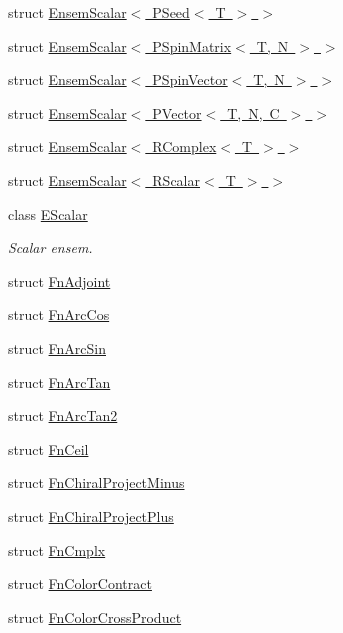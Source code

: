 \begin{DoxyCompactItemize}
\item 
struct \mbox{\hyperlink{structENSEM_1_1EnsemScalar_3_01PSeed_3_01T_01_4_01_4}{Ensem\+Scalar$<$ P\+Seed$<$ T $>$ $>$}}
\item 
struct \mbox{\hyperlink{structENSEM_1_1EnsemScalar_3_01PSpinMatrix_3_01T_00_01N_01_4_01_4}{Ensem\+Scalar$<$ P\+Spin\+Matrix$<$ T, N $>$ $>$}}
\item 
struct \mbox{\hyperlink{structENSEM_1_1EnsemScalar_3_01PSpinVector_3_01T_00_01N_01_4_01_4}{Ensem\+Scalar$<$ P\+Spin\+Vector$<$ T, N $>$ $>$}}
\item 
struct \mbox{\hyperlink{structENSEM_1_1EnsemScalar_3_01PVector_3_01T_00_01N_00_01C_01_4_01_4}{Ensem\+Scalar$<$ P\+Vector$<$ T, N, C $>$ $>$}}
\item 
struct \mbox{\hyperlink{structENSEM_1_1EnsemScalar_3_01RComplex_3_01T_01_4_01_4}{Ensem\+Scalar$<$ R\+Complex$<$ T $>$ $>$}}
\item 
struct \mbox{\hyperlink{structENSEM_1_1EnsemScalar_3_01RScalar_3_01T_01_4_01_4}{Ensem\+Scalar$<$ R\+Scalar$<$ T $>$ $>$}}
\item 
class \mbox{\hyperlink{classENSEM_1_1EScalar}{E\+Scalar}}
\begin{DoxyCompactList}\small\item\em Scalar ensem. \end{DoxyCompactList}\item 
struct \mbox{\hyperlink{structENSEM_1_1FnAdjoint}{Fn\+Adjoint}}
\item 
struct \mbox{\hyperlink{structENSEM_1_1FnArcCos}{Fn\+Arc\+Cos}}
\item 
struct \mbox{\hyperlink{structENSEM_1_1FnArcSin}{Fn\+Arc\+Sin}}
\item 
struct \mbox{\hyperlink{structENSEM_1_1FnArcTan}{Fn\+Arc\+Tan}}
\item 
struct \mbox{\hyperlink{structENSEM_1_1FnArcTan2}{Fn\+Arc\+Tan2}}
\item 
struct \mbox{\hyperlink{structENSEM_1_1FnCeil}{Fn\+Ceil}}
\item 
struct \mbox{\hyperlink{structENSEM_1_1FnChiralProjectMinus}{Fn\+Chiral\+Project\+Minus}}
\item 
struct \mbox{\hyperlink{structENSEM_1_1FnChiralProjectPlus}{Fn\+Chiral\+Project\+Plus}}
\item 
struct \mbox{\hyperlink{structENSEM_1_1FnCmplx}{Fn\+Cmplx}}
\item 
struct \mbox{\hyperlink{structENSEM_1_1FnColorContract}{Fn\+Color\+Contract}}
\item 
struct \mbox{\hyperlink{structENSEM_1_1FnColorCrossProduct}{Fn\+Color\+Cross\+Product}}

\end{DoxyCompactItemize}
